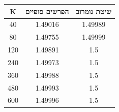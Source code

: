 \begin{tabular}{c c c}
K & הפרשים סופיים & שיטת נומרוב \\
\hline
40 & 1.49016 & 1.49989 \\
80 & 1.49755 & 1.49999 \\
120 & 1.49891 & 1.5 \\
240 & 1.49973 & 1.5 \\
360 & 1.49988 & 1.5 \\
480 & 1.49993 & 1.5 \\
600 & 1.49996 & 1.5 \\
\end{tabular}
